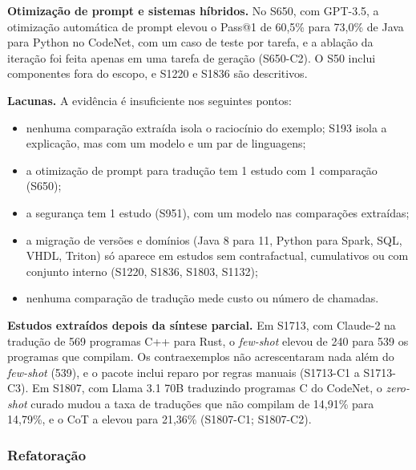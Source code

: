 \textbf{Otimização de prompt e sistemas híbridos.}
No S650, com GPT-3.5, a otimização automática de prompt elevou o Pass@1 de 60,5\% para 73,0\% de Java para Python no CodeNet, com um caso de teste por tarefa, e a ablação da iteração foi feita apenas em uma tarefa de geração (S650-C2).
O S50 inclui componentes fora do escopo, e S1220 e S1836 são descritivos.

\textbf{Lacunas.} A evidência é insuficiente nos seguintes pontos:
\begin{itemize}
  \item nenhuma comparação extraída isola o raciocínio do exemplo; S193 isola a explicação, mas com um modelo e um par de linguagens;
  \item a otimização de prompt para tradução tem 1 estudo com 1 comparação (S650);
  \item a segurança tem 1 estudo (S951), com um modelo nas comparações extraídas;
  \item a migração de versões e domínios (Java 8 para 11, Python para Spark, SQL, VHDL, Triton) só aparece em estudos sem contrafactual, cumulativos ou com conjunto interno (S1220, S1836, S1803, S1132);
  \item nenhuma comparação de tradução mede custo ou número de chamadas.
\end{itemize}

\textbf{Estudos extraídos depois da síntese parcial.}
Em S1713, com Claude-2 na tradução de 569 programas C++ para Rust, o \textit{few-shot} elevou de 240 para 539 os
programas que compilam. Os contraexemplos não acrescentaram nada além do \textit{few-shot} (539), e o pacote inclui
reparo por regras manuais (S1713-C1 a S1713-C3).
Em S1807, com Llama 3.1 70B traduzindo programas C do CodeNet, o \textit{zero-shot} curado mudou a taxa de
traduções que não compilam de 14,91\% para 14,79\%, e o CoT a elevou para 21,36\% (S1807-C1; S1807-C2).

\subsubsection{Refatoração}

